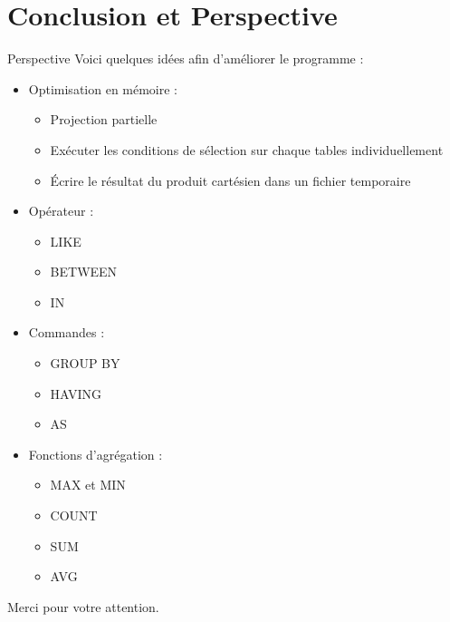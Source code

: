 \documentclass[10pt,handout]{beamer}
\begin{document}
\section{Conclusion et Perspective}

\begin{frame}{Perspective}
Voici quelques idées afin d'améliorer le programme :
\begin{itemize}
  \item Optimisation en mémoire :
  \begin{itemize}
    \item Projection partielle
    \item Exécuter les conditions de sélection sur chaque tables individuellement
    \item Écrire le résultat du produit cartésien dans un fichier temporaire
  \end{itemize}
  \item Opérateur :
  \begin{itemize}
    \item LIKE
    \item BETWEEN
    \item IN
  \end{itemize}
  \item Commandes :
  \begin{itemize}
    \item GROUP BY
    \item HAVING
    \item AS
  \end{itemize}
  \item Fonctions d’agrégation :
  \begin{itemize}
    \item MAX et MIN
    \item COUNT
    \item SUM
    \item AVG
  \end{itemize}
\end{itemize}
\end{frame}

\begin{frame}
  \begin{center}
    Merci pour votre attention.
  \end{center}
\end{frame}
\end{document}
